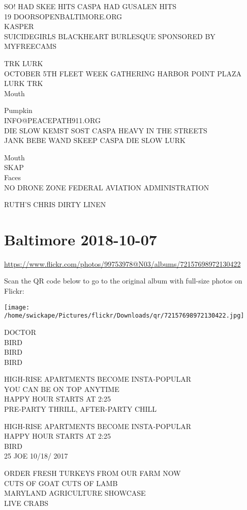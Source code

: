 \documentclass[10pt,letterpaper]{article}
\begin{document}
SO!  HAD SKEE HITS CASPA HAD GUSALEN HITS\\
19 DOORSOPENBALTIMORE.ORG\\
KASPER\\
SUICIDEGIRLS BLACKHEART BURLESQUE SPONSORED BY MYFREECAMS

TRK LURK\\
OCTOBER 5TH FLEET WEEK GATHERING HARBOR POINT PLAZA\\
LURK TRK\\
Mouth

Pumpkin\\
INFO@PEACEPATH911.ORG\\
DIE SLOW KEMST SOST CASPA HEAVY IN THE STREETS\\
JANK BEBE WAND SKEEP CASPA DIE SLOW LURK

Mouth\\
SKAP\\
Faces\\
NO DRONE ZONE FEDERAL AVIATION ADMINISTRATION

RUTH'S CHRIS DIRTY LINEN


\section*{Baltimore 2018-10-07}

\url{https://www.flickr.com/photos/99753978@N03/albums/72157698972130422}

Scan the QR code below to go to the original album with full-size photos on Flickr:

\texttt{[image: /home/swickape/Pictures/flickr/Downloads/qr/72157698972130422.jpg]}


DOCTOR\\
BIRD\\
BIRD\\
BIRD

HIGH{-}RISE APARTMENTS BECOME INSTA{-}POPULAR\\
YOU CAN BE ON TOP ANYTIME\\
HAPPY HOUR STARTS AT 2:25\\
PRE{-}PARTY THRILL, AFTER{-}PARTY CHILL

HIGH{-}RISE APARTMENTS BECOME INSTA{-}POPULAR\\
HAPPY HOUR STARTS AT 2:25\\
BIRD\\
25 JOE 10/18/ 2017

ORDER FRESH TURKEYS FROM OUR FARM NOW\\
CUTS OF GOAT CUTS OF LAMB\\
MARYLAND AGRICULTURE SHOWCASE\\
LIVE CRABS
\end{document}

